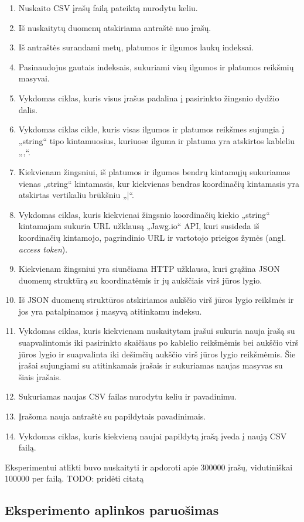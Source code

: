 \documentclass{VUMIFPSbakalaurinis}
\begin{document}
\begin{enumerate}
	\item Nuskaito CSV įrašų failą pateiktą nurodytu keliu.
	\item Iš nuskaitytų duomenų atskiriama antraštė nuo įrašų.
	\item Iš antraštės surandami metų, platumos ir ilgumos laukų indeksai.
	\item Pasinaudojus gautais indeksais, sukuriami visų ilgumos ir platumos reikšmių masyvai.
	\item Vykdomas ciklas, kuris visus įrašus padalina į pasirinkto žingsnio dydžio dalis.
	\item Vykdomas ciklas cikle, kuris visas ilgumos ir platumos reikšmes sujungia į „string“ tipo kintamuosius, kuriuose ilguma ir platuma yra atskirtos kableliu „,“.
	\item Kiekvienam žingsniui, iš platumos ir ilgumos bendrų kintamųjų sukuriamas vienas „string“ kintamasis, kur kiekvienas bendras koordinačių kintamasis yra atskirtas vertikaliu brūkšniu „|“.
	\item Vykdomas ciklas, kuris kiekvienai žingsnio koordinačių kiekio „string“ kintamajam sukuria URL užklausą „Jawg.io“ API, kuri susideda iš koordinačių kintamojo, pagrindinio URL ir vartotojo prieigos žymės (angl. \textit{access token}).
	\item Kiekvienam žingsniui yra siunčiama HTTP užklausa, kuri grąžina JSON duomenų struktūrą su koordinatėmis ir jų aukščiais virš jūros lygio.
	\item Iš JSON duomenų struktūros atskiriamos aukščio virš jūros lygio reikšmės ir jos yra patalpinamos į masyvą atitinkamu indeksu.
	\item Vykdomas ciklas, kuris kiekvienam nuskaitytam įrašui sukuria nauja įrašą su suapvalintomis iki pasirinkto skaičiaus po kablelio reikšmėmis bei aukščio virš jūros lygio ir suapvalinta iki dešimčių aukščio virš jūros lygio reikšmėmis. Šie įrašai sujungiami su atitinkamais įrašais ir sukuriamas naujas masyvas su šiais įrašais.
	\item Sukuriamas naujas CSV failas nurodytu keliu ir pavadinimu.
	\item Įrašoma nauja antraštė su papildytais pavadinimais.
	\item Vykdomas ciklas, kuris kiekvieną naujai papildytą įrašą įveda į naują CSV failą.
\end{enumerate}
Eksperimentui atlikti buvo nuskaityti ir apdoroti apie 300000 įrašų, vidutiniškai 100000 per failą.
TODO: pridėti citatą
\subsection{Eksperimento aplinkos paruošimas}
\end{document}
